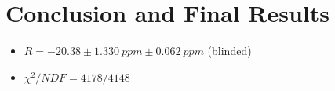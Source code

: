\chapter{Conclusion and Final Results}
\label{Ch:Conclusion}

\begin{itemize}
	\item{$R = -20.38 \pm \SI{1.330}{ppm} \pm \SI{0.062}{ppm}$ (blinded)}
	\item{$\chi^{2}/NDF = 4178/4148$}
\end{itemize}
